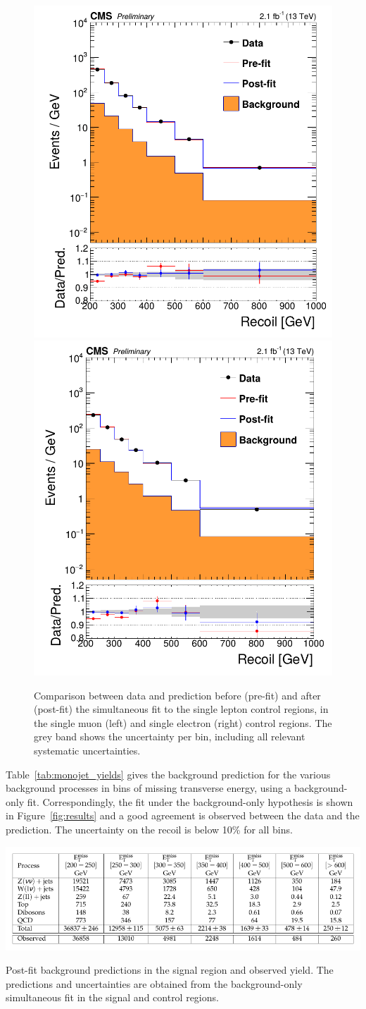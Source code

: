 \begin{figure}[p]
  \centering
 \includegraphics[width=.49\textwidth]{postfit_singlemuon.png} 
 \includegraphics[width=.49\textwidth]{postfit_singleelectron.png}
 \caption{Comparison between data and prediction before (pre-fit) and after (post-fit) the simultaneous fit to the single lepton control regions, in the single muon (left) and single electron (right) control regions. The grey band shows the uncertainty per bin, including all relevant systematic uncertainties.}
 \label{fig:postfit_2}
\end{figure}

Table~\ref{tab:monojet_yields} gives the background prediction for the various background processes in bins of missing transverse energy, using a background-only fit. Correspondingly, the fit under the background-only hypothesis is shown in Figure~\ref{fig:results} and a good agreement is observed between the data and the prediction. The uncertainty on the recoil is below 10\% for all bins.

\begin{table}[ht]
  \centering
 \includegraphics[width=\textwidth]{yields.pdf} 
 \caption{Post-fit background predictions in the signal region and observed yield. The predictions and uncertainties are obtained from the background-only simultaneous fit in the signal and control regions.}
 \label{tab:monojet_yields}
\end{table}

